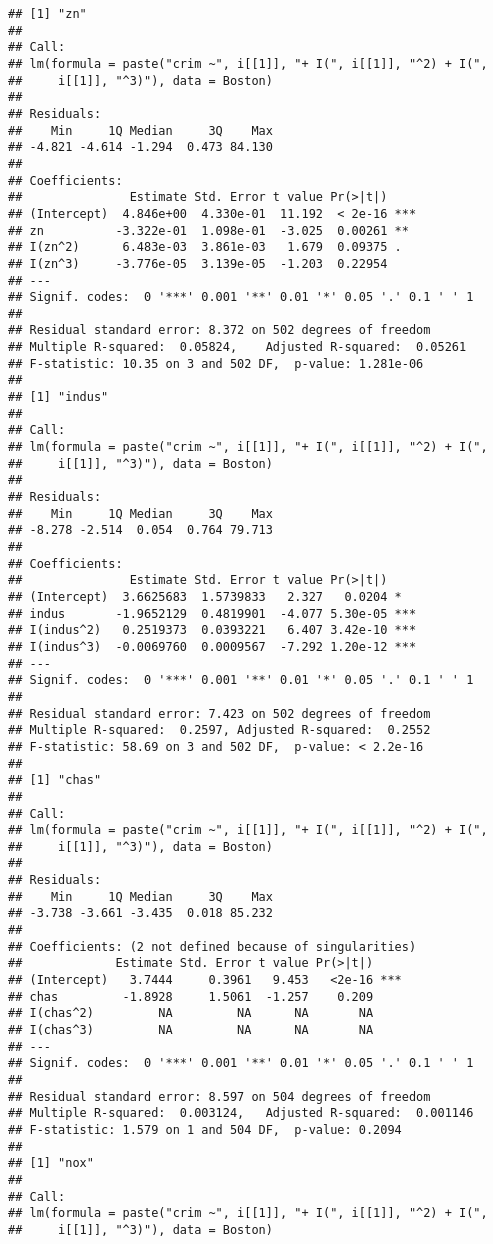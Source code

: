 \documentclass[
]{article}
\begin{document}
\begin{verbatim}
## [1] "zn"
## 
## Call:
## lm(formula = paste("crim ~", i[[1]], "+ I(", i[[1]], "^2) + I(", 
##     i[[1]], "^3)"), data = Boston)
## 
## Residuals:
##    Min     1Q Median     3Q    Max 
## -4.821 -4.614 -1.294  0.473 84.130 
## 
## Coefficients:
##               Estimate Std. Error t value Pr(>|t|)    
## (Intercept)  4.846e+00  4.330e-01  11.192  < 2e-16 ***
## zn          -3.322e-01  1.098e-01  -3.025  0.00261 ** 
## I(zn^2)      6.483e-03  3.861e-03   1.679  0.09375 .  
## I(zn^3)     -3.776e-05  3.139e-05  -1.203  0.22954    
## ---
## Signif. codes:  0 '***' 0.001 '**' 0.01 '*' 0.05 '.' 0.1 ' ' 1
## 
## Residual standard error: 8.372 on 502 degrees of freedom
## Multiple R-squared:  0.05824,    Adjusted R-squared:  0.05261 
## F-statistic: 10.35 on 3 and 502 DF,  p-value: 1.281e-06
## 
## [1] "indus"
## 
## Call:
## lm(formula = paste("crim ~", i[[1]], "+ I(", i[[1]], "^2) + I(", 
##     i[[1]], "^3)"), data = Boston)
## 
## Residuals:
##    Min     1Q Median     3Q    Max 
## -8.278 -2.514  0.054  0.764 79.713 
## 
## Coefficients:
##               Estimate Std. Error t value Pr(>|t|)    
## (Intercept)  3.6625683  1.5739833   2.327   0.0204 *  
## indus       -1.9652129  0.4819901  -4.077 5.30e-05 ***
## I(indus^2)   0.2519373  0.0393221   6.407 3.42e-10 ***
## I(indus^3)  -0.0069760  0.0009567  -7.292 1.20e-12 ***
## ---
## Signif. codes:  0 '***' 0.001 '**' 0.01 '*' 0.05 '.' 0.1 ' ' 1
## 
## Residual standard error: 7.423 on 502 degrees of freedom
## Multiple R-squared:  0.2597, Adjusted R-squared:  0.2552 
## F-statistic: 58.69 on 3 and 502 DF,  p-value: < 2.2e-16
## 
## [1] "chas"
## 
## Call:
## lm(formula = paste("crim ~", i[[1]], "+ I(", i[[1]], "^2) + I(", 
##     i[[1]], "^3)"), data = Boston)
## 
## Residuals:
##    Min     1Q Median     3Q    Max 
## -3.738 -3.661 -3.435  0.018 85.232 
## 
## Coefficients: (2 not defined because of singularities)
##             Estimate Std. Error t value Pr(>|t|)    
## (Intercept)   3.7444     0.3961   9.453   <2e-16 ***
## chas         -1.8928     1.5061  -1.257    0.209    
## I(chas^2)         NA         NA      NA       NA    
## I(chas^3)         NA         NA      NA       NA    
## ---
## Signif. codes:  0 '***' 0.001 '**' 0.01 '*' 0.05 '.' 0.1 ' ' 1
## 
## Residual standard error: 8.597 on 504 degrees of freedom
## Multiple R-squared:  0.003124,   Adjusted R-squared:  0.001146 
## F-statistic: 1.579 on 1 and 504 DF,  p-value: 0.2094
## 
## [1] "nox"
## 
## Call:
## lm(formula = paste("crim ~", i[[1]], "+ I(", i[[1]], "^2) + I(", 
##     i[[1]], "^3)"), data = Boston)

\end{verbatim}
\end{document}
